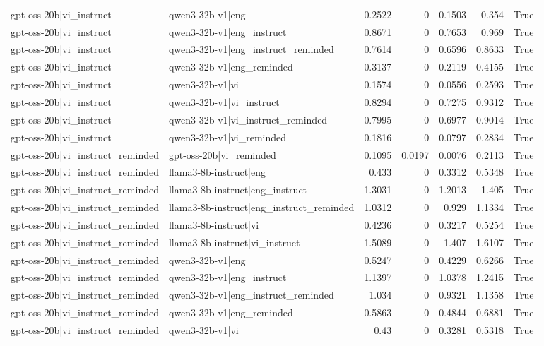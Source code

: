 \begin{table}
\begin{tabular}{l l r r r r l}
gpt-oss-20b|vi_instruct & qwen3-32b-v1|eng & 0.2522 & 0 & 0.1503 & 0.354 & True \\
gpt-oss-20b|vi_instruct & qwen3-32b-v1|eng_instruct & 0.8671 & 0 & 0.7653 & 0.969 & True \\
gpt-oss-20b|vi_instruct & qwen3-32b-v1|eng_instruct_reminded & 0.7614 & 0 & 0.6596 & 0.8633 & True \\
gpt-oss-20b|vi_instruct & qwen3-32b-v1|eng_reminded & 0.3137 & 0 & 0.2119 & 0.4155 & True \\
gpt-oss-20b|vi_instruct & qwen3-32b-v1|vi & 0.1574 & 0 & 0.0556 & 0.2593 & True \\
gpt-oss-20b|vi_instruct & qwen3-32b-v1|vi_instruct & 0.8294 & 0 & 0.7275 & 0.9312 & True \\
gpt-oss-20b|vi_instruct & qwen3-32b-v1|vi_instruct_reminded & 0.7995 & 0 & 0.6977 & 0.9014 & True \\
gpt-oss-20b|vi_instruct & qwen3-32b-v1|vi_reminded & 0.1816 & 0 & 0.0797 & 0.2834 & True \\
gpt-oss-20b|vi_instruct_reminded & gpt-oss-20b|vi_reminded & 0.1095 & 0.0197 & 0.0076 & 0.2113 & True \\
gpt-oss-20b|vi_instruct_reminded & llama3-8b-instruct|eng & 0.433 & 0 & 0.3312 & 0.5348 & True \\
gpt-oss-20b|vi_instruct_reminded & llama3-8b-instruct|eng_instruct & 1.3031 & 0 & 1.2013 & 1.405 & True \\
gpt-oss-20b|vi_instruct_reminded & llama3-8b-instruct|eng_instruct_reminded & 1.0312 & 0 & 0.929 & 1.1334 & True \\
gpt-oss-20b|vi_instruct_reminded & llama3-8b-instruct|vi & 0.4236 & 0 & 0.3217 & 0.5254 & True \\
gpt-oss-20b|vi_instruct_reminded & llama3-8b-instruct|vi_instruct & 1.5089 & 0 & 1.407 & 1.6107 & True \\
gpt-oss-20b|vi_instruct_reminded & qwen3-32b-v1|eng & 0.5247 & 0 & 0.4229 & 0.6266 & True \\
gpt-oss-20b|vi_instruct_reminded & qwen3-32b-v1|eng_instruct & 1.1397 & 0 & 1.0378 & 1.2415 & True \\
gpt-oss-20b|vi_instruct_reminded & qwen3-32b-v1|eng_instruct_reminded & 1.034 & 0 & 0.9321 & 1.1358 & True \\
gpt-oss-20b|vi_instruct_reminded & qwen3-32b-v1|eng_reminded & 0.5863 & 0 & 0.4844 & 0.6881 & True \\
gpt-oss-20b|vi_instruct_reminded & qwen3-32b-v1|vi & 0.43 & 0 & 0.3281 & 0.5318 & True \\

\end{tabular}
\end{table}
